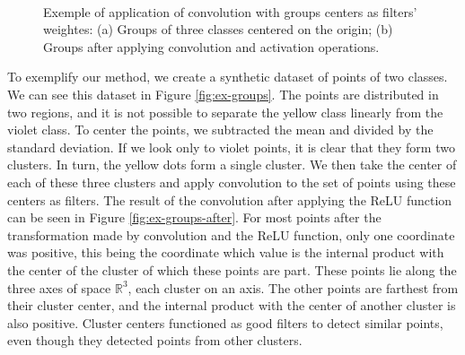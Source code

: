 \documentclass[a4paper,conference]{IEEEtran}
\begin{document}
\begin{figure}[!t]
  \centering
  ~
  \caption{Exemple of application of convolution with groups centers as filters' weightes: (a) Groups of three classes centered on the origin; (b) Groups after applying convolution and activation operations. }
  \label{fig:filter}
\end{figure}

To exemplify our method, we create a synthetic dataset of points of two classes. We can see this dataset in Figure \ref{fig:ex-groups}. The points are distributed in two regions, and it is not possible to separate the yellow class linearly from the violet class. To center the points,  we subtracted the mean and divided by the standard deviation. If we look only to violet points, it is clear that they form two clusters. In turn, the yellow dots form a single cluster. We then take the center of each of these three clusters and apply convolution to the set of points using these centers as filters. The result of the convolution after applying the ReLU function can be seen in Figure \ref{fig:ex-groups-after}. For most points after the transformation made by convolution and the ReLU function, only one coordinate was positive, this being the coordinate which value is the internal product with the center of the cluster of which these points are part. These points lie along the three axes of space $\mathbb{R}^3$, each cluster on an axis. The other points are farthest from their cluster center, and the internal product with the center of another cluster is also positive. Cluster centers functioned as good filters to detect similar points, even though they detected points from other clusters.
\end{document}
